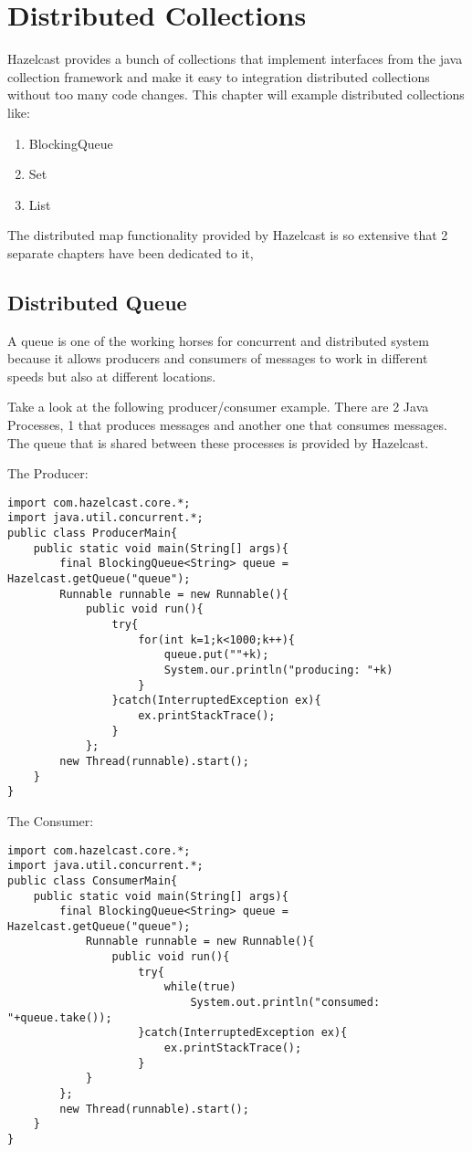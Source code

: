 \chapter{Distributed Collections}

Hazelcast provides a bunch of collections that implement interfaces from the java collection 
framework and make it easy to integration distributed collections without too many code changes.
This chapter will example distributed collections like:
\begin{enumerate}
\item BlockingQueue
\item Set
\item List
\end{enumerate}
The distributed map functionality provided by Hazelcast is so extensive that 2 separate chapters
have been dedicated to it,

\section{Distributed Queue}

A queue is one of the working horses for concurrent and distributed system because it 
allows producers and consumers of messages to work in different speeds but also at different
locations.

Take a look at the following producer/consumer example. There are 2 Java Processes, 1 that
produces messages and another one that consumes messages. The queue that is shared between
these processes is provided by Hazelcast.

The Producer:
\begin{verbatim}
import com.hazelcast.core.*;
import java.util.concurrent.*;
public class ProducerMain{
    public static void main(String[] args){
        final BlockingQueue<String> queue = Hazelcast.getQueue("queue");
        Runnable runnable = new Runnable(){
            public void run(){
                try{
                    for(int k=1;k<1000;k++){
                        queue.put(""+k);
                        System.our.println("producing: "+k)
                    }
                }catch(InterruptedException ex){
                    ex.printStackTrace();
                }
            };
        new Thread(runnable).start();
    }
}
\end{verbatim}

The Consumer:
\begin{verbatim}
import com.hazelcast.core.*;
import java.util.concurrent.*;
public class ConsumerMain{
    public static void main(String[] args){
        final BlockingQueue<String> queue = Hazelcast.getQueue("queue");
            Runnable runnable = new Runnable(){
                public void run(){
                    try{
                        while(true)
                            System.out.println("consumed: "+queue.take());
                    }catch(InterruptedException ex){
                        ex.printStackTrace();
                    }
            }
        };
        new Thread(runnable).start();
    }
}
\end{verbatim}

